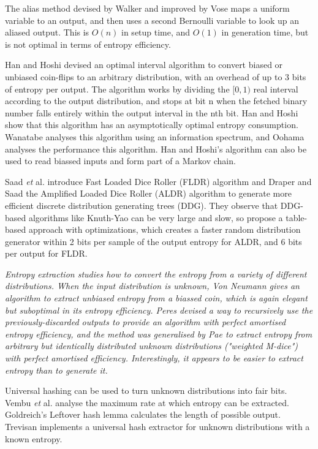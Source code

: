 \documentclass[12pt]{article}
\begin{document}
The alias method devised by Walker \cite{walker1977efficient} and improved by Vose \cite{vose91} maps a uniform variable to an output, and then uses a second Bernoulli variable to look up an aliased output. This is $O(n)$ in setup time, and $O(1)$ in generation time, but is not optimal in terms of entropy efficiency.

Han and Hoshi \cite{han97} devised an optimal interval algorithm to convert biased or unbiased coin-flips to an arbitrary distribution, with an overhead of up to 3 bits of entropy per output.  The algorithm works by dividing the $[0,1)$ real interval according to the output distribution, and stops at bit n when the fetched binary number falls entirely within the output interval in the nth bit. Han and Hoshi show that this algorithm has an asymptotically optimal entropy consumption. 
Wanatabe \cite{wanatabe20} analyses this algorithm using an information spectrum, and Oohama \cite{oohama11, oohama2020performance} analyses the performance this algorithm. Han and Hoshi's algorithm can also be used to read biassed inputs and form part of a Markov chain.

Saad \emph{et} al. \cite{saad2020fldr} introduce Fast Loaded Dice Roller (FLDR) algorithm and Draper and Saad \cite{draper2025efficient} the Amplified Loaded Dice Roller (ALDR) algorithm to generate more efficient discrete distribution generating trees (DDG). They observe that DDG-based algorithms like Knuth-Yao can be very large and slow, so propose a table-based approach with optimizations, which creates a faster random distribution generator within 2 bits per sample of the output entropy for ALDR, and 6 bits per output for FLDR.

\em Entropy extraction \em studies how to convert the entropy \em from \em a variety of different distributions. When the input distribution is unknown, Von Neumann \cite{neumann51} gives an algorithm to extract unbiased entropy from a biassed coin, which is again elegant but suboptimal in its entropy efficiency. Peres \cite{peres1992iterating} devised a way to recursively use the previously-discarded outputs to provide an algorithm with perfect amortised entropy efficiency, and the method was generalised by Pae \cite{pae15} to extract entropy from arbitrary but identically distributed unknown distributions ("weighted M-dice") with perfect amortised efficiency. Interestingly, it appears to be easier to extract entropy than to generate it.

Universal hashing can be used to turn unknown distributions into fair bits. Vembu \emph{et} al. \cite{vembu95} analyse the maximum rate at which entropy can be extracted. Goldreich's Leftover hash lemma \cite{goldreich2004foundations} calculates the length of possible output. Trevisan \cite{trevisan2001extractors} implements a universal hash extractor for unknown distributions with a known entropy. 
\end{document}
